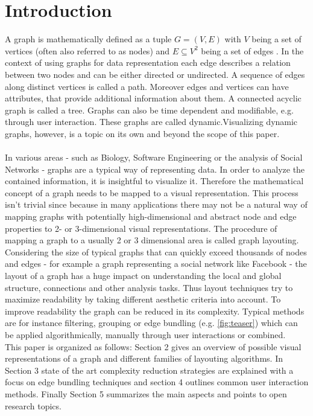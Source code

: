 \section{Introduction}
A graph is mathematically defined as a tuple $ G = (V, E)$ with $V$ being a set of vertices (often also referred to as nodes) and $E \subseteq V^2$ being a set of edges \cite{Al-Taie2017}. In the context of using graphs for data representation each edge describes a relation between two nodes and can be either directed or undirected. A sequence of edges along distinct vertices is called a path. Moreover edges and vertices can have attributes, that provide additional information about them. A connected acyclic graph is called a tree. Graphs can also be time dependent and modifiable, e.g. through user interaction. These graphs are called dynamic.Visualizing dynamic graphs, however, is a topic on its own and beyond the scope of this paper.\\
\\
In various areas - such as Biology, Software Engineering or the analysis of Social Networks - graphs are a typical way of representing data. In order to analyze the contained information, it is insightful to visualize it. Therefore the mathematical concept of a graph needs to be mapped to a visual representation. This process isn't trivial since because in many applications there may not be a natural way of mapping graphs with potentially high-dimensional and abstract node and edge properties to 2- or 3-dimensional visual representations.
The procedure of mapping a graph to a usually 2 or 3 dimensional area is called graph layouting. 
Considering the size of typical graphs that can quickly exceed thousands of nodes and edges - for example a graph representing a social network like Facebook -  the layout of a graph has a huge impact on understanding the local and global structure, connections and other analysis tasks. Thus layout techniques try to maximize readability by taking different aesthetic criteria into account. To improve readability the graph can be reduced in its complexity. Typical methods are for instance filtering, grouping or edge bundling (e.g. \autoref{fig:teaser}) which can be applied algorithmically, manually through user interactions or combined. \\ This paper is organized as follows: Section 2 gives an overview of possible visual representations of a graph and different families of layouting algorithms. In Section 3 state of the art complexity reduction strategies are explained with a focus on edge bundling techniques and section 4 outlines common user interaction methods. Finally Section 5 summarizes the main aspects and points to open research topics.

